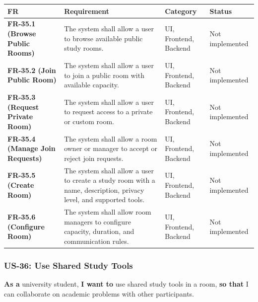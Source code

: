 \documentclass[12pt]{article}
\renewcommand{\baselinestretch}{1.5}
\begin{document}
\begingroup
\small
\renewcommand{\baselinestretch}{1.0}\selectfont
\renewcommand{\arraystretch}{1.15}
\setlength{\tabcolsep}{6pt}
\begin{longtable}{|>{\raggedright\arraybackslash}p{}|>{\raggedright\arraybackslash}p{}|>{\raggedright\arraybackslash}p{}|>{\raggedright\arraybackslash}p{}|}
\hline
\textbf{FR} & \textbf{Requirement} & \textbf{Category} & \textbf{Status} \\ \hline
\endhead
\textbf{FR-35.1 (Browse Public Rooms)} & The system shall allow a user to browse available public study rooms. & UI, Frontend, Backend & Not implemented \\ \hline
\textbf{FR-35.2 (Join Public Room)} & The system shall allow a user to join a public room with available capacity. & UI, Frontend, Backend & Not implemented \\ \hline
\textbf{FR-35.3 (Request Private Room)} & The system shall allow a user to request access to a private or custom room. & UI, Frontend, Backend & Not implemented \\ \hline
\textbf{FR-35.4 (Manage Join Requests)} & The system shall allow a room owner or manager to accept or reject join requests. & UI, Frontend, Backend & Not implemented \\ \hline
\textbf{FR-35.5 (Create Room)} & The system shall allow a user to create a study room with a name, description, privacy level, and supported tools. & UI, Frontend, Backend & Not implemented \\ \hline
\textbf{FR-35.6 (Configure Room)} & The system shall allow room managers to configure capacity, duration, and communication rules. & UI, Frontend, Backend & Not implemented \\ \hline
\end{longtable}
\endgroup
\par\medskip

\hypertarget{sec:us-36-use-shared-study-tools}{}
\subsubsection*{US-36: Use Shared Study Tools}
\par\medskip

\textbf{As a} university student, \textbf{I want to} use shared study tools in a room, \textbf{so that} I can collaborate on academic problems with other participants.
\par\medskip
\end{document}
